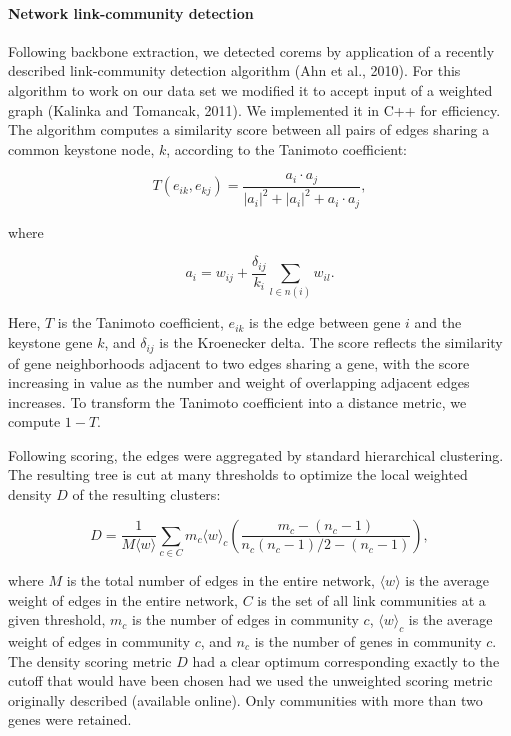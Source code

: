 \paragraph{Network link-community detection}

Following backbone extraction, we detected corems by application of a
recently described link-community detection algorithm (Ahn et al.,
2010). For this algorithm to work on our data set we modified it to
accept input of a weighted graph (Kalinka and Tomancak, 2011). We
implemented it in C++ for efficiency. The algorithm computes a
similarity score between all pairs of edges sharing a common keystone
node, $k$, according to the Tanimoto coefficient:

\begin{equation}
T(e_{ik},e_{kj}) = \frac{a_i\cdot a_j}{|a_i|^2+|a_i|^2+a_i\cdot a_j},
\end{equation}

\noindent where

\begin{equation}
a_i=w_{ij}+\frac{\delta_{ij}}{k_i}\sum_{l\in n(i)}w_{il}.
\end{equation}

\noindent Here, $T$ is the Tanimoto coefficient, $e_{ik}$ is the edge between gene $i$
and the keystone gene $k$, and $\delta_{ij}$ is the Kroenecker delta. The score
reflects the similarity of gene neighborhoods adjacent to two edges
sharing a gene, with the score increasing in value as the number and
weight of overlapping adjacent edges increases. To transform the
Tanimoto coefficient into a distance metric, we compute $1-T$.

Following scoring, the edges were aggregated by standard hierarchical
clustering. The resulting tree is cut at many thresholds to optimize
the local weighted density $D$ of the resulting clusters:

\begin{equation}
D=\frac{1}{M\langle w\rangle}\sum_{c\in C}m_c\langle w\rangle_c\left(\frac{m_c-(n_c-1)}{n_c(n_c-1)/2-(n_c-1)}\right),
\end{equation}

\noindent where $M$ is the total number of edges in the
entire network, $\langle w\rangle$ is the average weight of edges in the entire
network, $C$ is the set of all link communities at a given threshold, $m_c$
is the number of edges in community $c$, $\langle w\rangle_c$ is the average weight of
edges in community $c$, and $n_c$ is the number of genes in community
$c$. The density scoring metric $D$ had a clear optimum corresponding exactly to
the cutoff that would have been chosen had we used the unweighted
scoring metric originally described (available online). Only
communities with more than two genes were retained.

